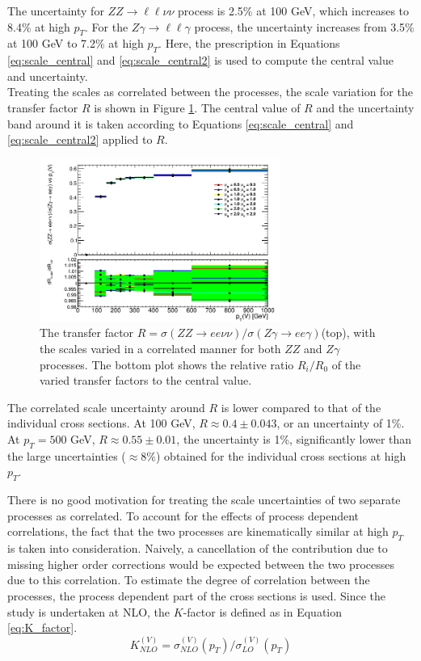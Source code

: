 \documentclass[12pt,a4paper,openright,twoside]{report}
\newcommand{\ZZ}{$ZZ\to \ell\ell\nu\nu$ }
\newcommand{\Zg}{$Z\gamma\to \ell\ell\gamma$ }
\begin{document}
The uncertainty for \ZZ process is 2.5\% at 100 GeV, which increases to 8.4\% at high $p_T$. For the \Zg process, the uncertainty increases from 3.5\% at 100 GeV to 7.2\% at high $p_T$. Here, the prescription in Equations \ref{eq:scale_central} and \ref{eq:scale_central2} is used to compute the central value and uncertainty.\\ Treating the scales as correlated between the processes, the scale variation for the transfer factor $R$ is shown in Figure \ref{fig:R_scale}. The central value of $R$ and the uncertainty band around it is taken according to Equations \ref{eq:scale_central} and \ref{eq:scale_central2} applied to $R$.
\begin{figure}[H]
\centering
\includegraphics[width=0.7\textwidth]{R_scale.png}
\caption{The transfer factor $R = \sigma(ZZ\to ee\nu\nu)/\sigma(Z\gamma\to ee\gamma)$(top), with the scales varied in a correlated manner for both $ZZ$ and $Z\gamma$ processes. The bottom plot shows the relative ratio $R_i/R_0$ of the varied transfer factors to the central value.}
\label{fig:R_scale}
\end{figure}
The correlated scale uncertainty around $R$ is lower compared to that of the individual cross sections. At 100 GeV, $R \approx 0.4 \pm 0.043$, or an uncertainty of 1\%. At $p_T = 500$ GeV, $R\approx 0.55 \pm 0.01$, the uncertainty is 1\%, significantly lower than the large uncertainties ($\approx 8\%$) obtained for the individual cross sections at high $p_T$.

There is no good motivation for treating the scale uncertainties of two separate processes as correlated. To account for the effects of process dependent correlations, the fact that the two processes are kinematically similar at high $p_T$ is taken into consideration. Naively, a cancellation of the contribution due to missing higher order corrections would be expected between the two processes due to this correlation. To estimate the degree of correlation between the processes, the process dependent part of the cross sections is used. Since the study is undertaken at NLO, the $K$-factor is defined as in Equation \ref{eq:K_factor}.
\begin{equation}
K_{NLO}^{(V)} = \sigma_{NLO}^{(V)}(p_T)/\sigma_{LO}^{(V)}(p_T)
\label{eq:K_factor}
\end{equation}
\end{document}
